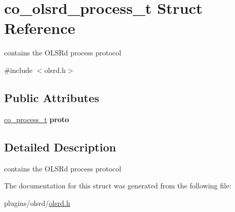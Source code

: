 \hypertarget{structco__olsrd__process__t}{\section{co\-\_\-olsrd\-\_\-process\-\_\-t Struct Reference}
\label{structco__olsrd__process__t}
}


contains the O\-L\-S\-Rd process protocol  




{\ttfamily \#include $<$olsrd.\-h$>$}

\subsection*{Public Attributes}
\begin{DoxyCompactItemize}
\item 
\hypertarget{structco__olsrd__process__t_a598b23519e15a67bf9b861bf19dd38d6}{\hyperlink{structco__process__t}{co\-\_\-process\-\_\-t} {\bfseries proto}}\label{structco__olsrd__process__t_a598b23519e15a67bf9b861bf19dd38d6}

\end{DoxyCompactItemize}


\subsection{Detailed Description}
contains the O\-L\-S\-Rd process protocol 

The documentation for this struct was generated from the following file\-:\begin{DoxyCompactItemize}
\item 
plugins/olsrd/\hyperlink{olsrd_8h}{olsrd.\-h}\end{DoxyCompactItemize}
